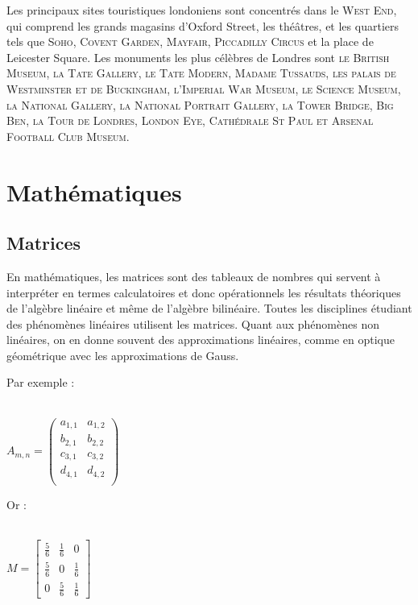 \documentclass{article}
\begin{document}
Les principaux sites touristiques londoniens sont concentrés dans le \textsc{West End}, qui comprend les grands magasins d’Oxford Street, les théâtres, et les quartiers tels que \textsc{Soho, Covent Garden, Mayfair, Piccadilly Circus} et la place de Leicester Square. Les monuments les plus célèbres de Londres sont \textsc{le British Museum, la Tate Gallery, le Tate Modern, Madame Tussauds, les palais de Westminster et de Buckingham, l’Imperial War Museum, le Science Museum, la National Gallery, la National Portrait Gallery, la Tower Bridge, Big Ben, la Tour de Londres, London Eye, Cathédrale St Paul et Arsenal Football Club Museum}.

\newpage

\section{Mathématiques}

\subsection{Matrices}



En mathématiques, les matrices sont des tableaux de nombres qui servent à interpréter en termes calculatoires et donc opérationnels les résultats théoriques de l'algèbre linéaire et même de l'algèbre bilinéaire. 
Toutes les disciplines étudiant des phénomènes linéaires utilisent les matrices. Quant aux phénomènes non linéaires, on en donne souvent des approximations linéaires, comme en optique géométrique avec les approximations de Gauss.

Par exemple :
\ \\ \ \\

\begin{center}

$
A_{m,n} = 
\begin{pmatrix}
a_{1,1} & a_{1,2} \\
b_{2,1} & b_{2,2} \\
c_{3,1} & c_{3,2} \\
d_{4,1} & d_{4,2} \\

\end{pmatrix} 
$
\end{center}

Or :
\ \\ \ \\

\begin{center}
$
M = \begin{bmatrix}
       \frac{5}{6} & \frac{1}{6} & 0           \\[0.3em]
       \frac{5}{6} & 0           & \frac{1}{6} \\[0.3em]
       0           & \frac{5}{6} & \frac{1}{6}
     \end{bmatrix}
$
\end{center}
\end{document}
